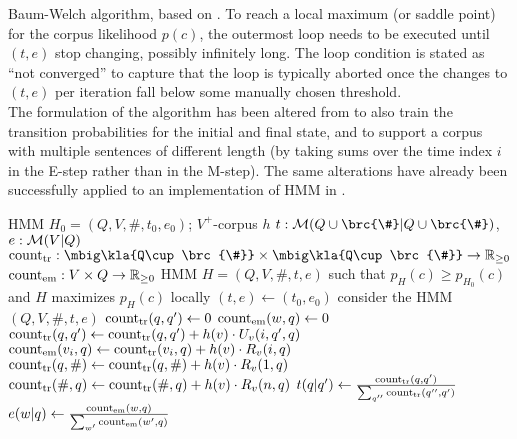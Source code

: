 \begin{algorithm}[p!]
 \caption{Baum-Welch algorithm, based on \cite[p.~226]{jm09}. To reach a local
 maximum (or saddle point) for the corpus likelihood $p(c)$, the outermost loop
 needs to be executed until $(t,e)$ stop changing, possibly infinitely long.
 The loop condition is stated as ``not converged'' to capture that the loop is
 typically aborted once the changes to $(t,e)$ per iteration fall below some
 manually chosen threshold.\\[1em]
 The formulation of the algorithm has been altered from \cite{jm09} to also
 train the transition probabilities for the initial and final state, and to
 support a corpus with multiple sentences of different length (by taking sums
 over the time index $i$ in the E-step rather than in the M-step). The same
 alterations have already been successfully applied to an implementation of HMM
 in \cite{nel13}. \label{alg:bw-vogler}}
 \begin{algorithmic}[1]
  \algorithmheader[Input:] HMM $H_0 = (Q,V,\#,t_0,e_0)$; $V^+$-corpus $h$
  \algorithmheader[Variables:] $t:\um(Q\cup\brc{\#}|Q\cup\brc{\#})$, $e:\mathcal M(V|Q)$
  \algorithmheader             $\cnt_\mathrm{tr}: \mbig\kla{Q\cup\brc{\#}}\times\mbig\kla{Q\cup\brc{\#}}\to\zr_{\geq0}$
  \algorithmheader             $\operatorname{count}_\mathrm{em}: V\times Q\to\mathbb R_{\geq0}$
  \algorithmheader[Output:] HMM $H = (Q,V,\#,t,e)$
  \algorithmheader such that $p_H(c) \geq p_{H_0}(c)$ and $H$ maximizes $p_H(c)$ locally
  \STATE $(t,e) \leftarrow (t_0,e_0)$
   \STATE consider the HMM $(Q,V,\#,t,e)$
   \STATE $\operatorname{count}_\mathrm{tr}(q,q') \leftarrow 0$ 
   \STATE $\operatorname{count}_\mathrm{em}(w,q) \leftarrow 0$ 
      \STATE $\operatorname{count}_\mathrm{tr}(q,q') \leftarrow \operatorname{count}_\mathrm{tr}(q,q') + h(v) \cdot U_v(i,q',q)$
     \ENDFOR
    \ENDFOR
      \STATE $\operatorname{count}_\mathrm{em}(v_i,q) \leftarrow \operatorname{count}_\mathrm{tr}(v_i,q) + h(v) \cdot R_v(i,q)$
     \ENDFOR
    \ENDFOR
     \STATE $\operatorname{count}_\mathrm{tr}(q,\#) \leftarrow \operatorname{count}_\mathrm{tr}(q,\#) + h(v) \cdot R_v(1,q)$
     \STATE $\operatorname{count}_\mathrm{tr}(\#,q) \leftarrow \operatorname{count}_\mathrm{tr}(\#,q) + h(v) \cdot R_v(n,q)$
    \ENDFOR
   \ENDFOR
    \STATE $t(q|q') \leftarrow \frac{\operatorname{count}_\mathrm{tr}(q,q')}{\sum_{q''} \operatorname{count}_\mathrm{tr}(q'',q')}$
   \ENDFOR
    \STATE $e(w|q) \leftarrow \frac{\operatorname{count}_\mathrm{em}(w,q)}{\sum_{w'} \operatorname{count}_\mathrm{em}(w',q)}$
   \ENDFOR
  \ENDWHILE
 \end{algorithmic}
\end{algorithm}

